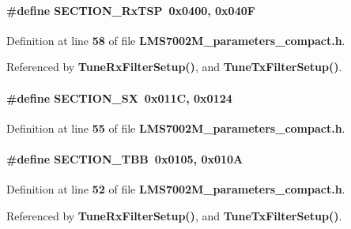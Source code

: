 \paragraph[{S\+E\+C\+T\+I\+O\+N\+\_\+\+Rx\+T\+SP}]{\setlength{\rightskip}{0pt plus 5cm}\#define S\+E\+C\+T\+I\+O\+N\+\_\+\+Rx\+T\+SP~0x0400, 0x040F}\label{LMS7002M__parameters__compact_8h_af179cf5518032d7497efdb91714b5407}


Definition at line {\bf 58} of file {\bf L\+M\+S7002\+M\+\_\+parameters\+\_\+compact.\+h}.



Referenced by {\bf Tune\+Rx\+Filter\+Setup()}, and {\bf Tune\+Tx\+Filter\+Setup()}.

\paragraph[{S\+E\+C\+T\+I\+O\+N\+\_\+\+SX}]{\setlength{\rightskip}{0pt plus 5cm}\#define S\+E\+C\+T\+I\+O\+N\+\_\+\+SX~0x011\+C, 0x0124}\label{LMS7002M__parameters__compact_8h_ad56fe0038fa1215fb55176b84023a807}


Definition at line {\bf 55} of file {\bf L\+M\+S7002\+M\+\_\+parameters\+\_\+compact.\+h}.

\paragraph[{S\+E\+C\+T\+I\+O\+N\+\_\+\+T\+BB}]{\setlength{\rightskip}{0pt plus 5cm}\#define S\+E\+C\+T\+I\+O\+N\+\_\+\+T\+BB~0x0105, 0x010A}\label{LMS7002M__parameters__compact_8h_a3c3b10dc4b46834cbbb16369a9d0e6e4}


Definition at line {\bf 52} of file {\bf L\+M\+S7002\+M\+\_\+parameters\+\_\+compact.\+h}.



Referenced by {\bf Tune\+Rx\+Filter\+Setup()}, and {\bf Tune\+Tx\+Filter\+Setup()}.

